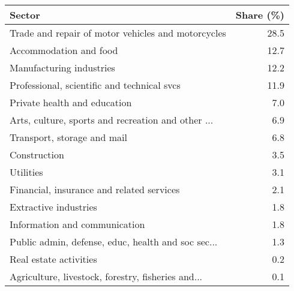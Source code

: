 \begin{tabular}{lr}
\toprule
                                            Sector &  Share (\%) \\
\midrule
Trade and repair of motor vehicles and motorcycles &       28.5 \\
                            Accommodation and food &       12.7 \\
                          Manufacturing industries &       12.2 \\
       Professional, scientific and technical svcs &       11.9 \\
                      Private health and education &        7.0 \\
Arts, culture, sports and recreation and other ... &        6.9 \\
                       Transport, storage and mail &        6.8 \\
                                      Construction &        3.5 \\
                                         Utilities &        3.1 \\
         Financial, insurance and related services &        2.1 \\
                             Extractive industries &        1.8 \\
                     Information and communication &        1.8 \\
Public admin, defense, educ, health and soc sec... &        1.3 \\
                            Real estate activities &        0.2 \\
Agriculture, livestock, forestry, fisheries and... &        0.1 \\
\bottomrule
\end{tabular}
